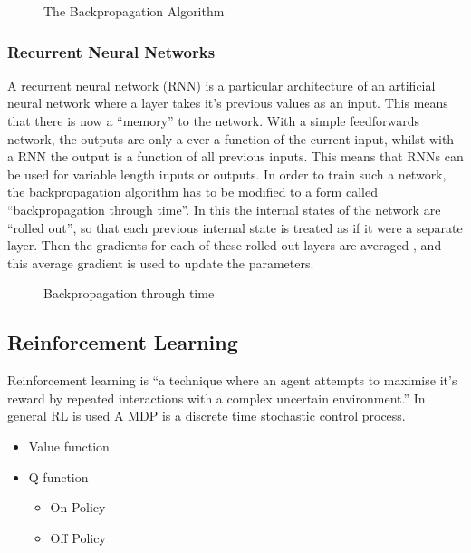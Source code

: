 
\begin{figure}
\caption{The Backpropagation Algorithm}
\label{fig:backprop}
\end{figure}

\subsubsection{Recurrent Neural Networks}

A recurrent neural network (RNN) is a particular architecture of an artificial neural network where a layer takes it's previous values as an input. This means that there is now a ``memory'' to the network. With a simple feedforwards network, the outputs are only a ever a function of the current input, whilst with a RNN the output is a function of all previous inputs. This means that RNNs can be used for variable length inputs or outputs. In order to train such a network, the backpropagation algorithm has to be modified to a form called ``backpropagation through time''. In this the internal states of the network are ``rolled out'', so that each previous internal state is treated as if it were a separate layer. Then the gradients for each of these rolled out layers are averaged%
, and this average gradient is used to update the parameters.

\begin{figure}
\caption{Backpropagation through time}
\label{fig:bptt}
\end{figure}

\subsection{Reinforcement Learning}
Reinforcement learning is ``a technique where an agent attempts to maximise it's reward by repeated interactions with a complex uncertain environment.'' \cite{Sutton:1998:IRL:551283}
In general RL is used 
A MDP is a discrete time stochastic control process.

\begin{figure}

\end{figure}

\begin{itemize}
\item Value function
\item Q function
\begin{itemize}
\item On Policy
\item Off Policy

\end{itemize}

\end{itemize}


